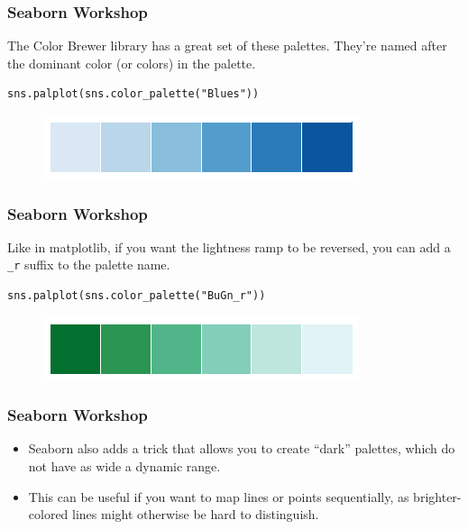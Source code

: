 \documentclass{beamer}
\begin{document}
\begin{frame}[fragile]
\frametitle{Seaborn Workshop}
\large

The Color Brewer library has a great set of these palettes. They’re named after the dominant color (or colors) in the palette.
\begin{verbatim}
sns.palplot(sns.color_palette("Blues"))
\end{verbatim}

\begin{figure}
	\centering
	\includegraphics[width=0.7\linewidth]{images/color_palettes_25_0}
\end{figure}
\end{frame}
\begin{frame}[fragile]
	\frametitle{Seaborn Workshop}
	\large
	Like in matplotlib, if you want the lightness ramp to be reversed, you can add a \texttt{\_r} suffix to the palette name.
\begin{verbatim}
sns.palplot(sns.color_palette("BuGn_r"))
\end{verbatim}

\begin{figure}
	\centering
	\includegraphics[width=0.7\linewidth]{images/color_palettes_27_0}
\end{figure}


\end{frame}
\begin{frame}[fragile]
	\frametitle{Seaborn Workshop}
	\large
\begin{itemize}
\item Seaborn also adds a trick that allows you to create “dark” palettes, which do not have as wide a dynamic range. 
\item This can be useful if you want to map lines or points sequentially, as brighter-colored lines might otherwise be hard to distinguish.
\end{itemize}

\end{frame}
\end{document}
